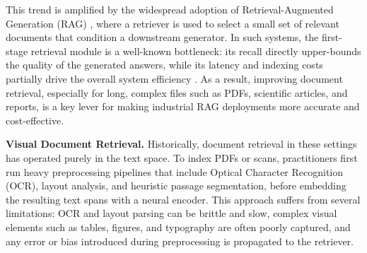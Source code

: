 This trend is amplified by the widespread adoption of Retrieval-Augmented Generation (RAG) , where a retriever is used to select a small set of relevant documents that condition a downstream generator. In such systems, the first-stage retrieval module is a well-known bottleneck: its recall directly upper-bounds the quality of the generated answers, while its latency and indexing costs partially drive the overall system efficiency . As a result, improving document retrieval, especially for long, complex files such as PDFs, scientific articles, and reports, is a key lever for making industrial RAG deployments more accurate and cost-effective.

\textbf{Visual Document Retrieval.} Historically, document retrieval in these settings has operated purely in the text space. To index PDFs or scans, practitioners first run heavy preprocessing pipelines that include Optical Character Recognition (OCR), layout analysis, and heuristic passage segmentation, before embedding the resulting text spans with a neural encoder. 
This approach suffers from several limitations: OCR and layout parsing can be brittle and slow, complex visual elements such as tables, figures, and typography are often poorly captured, and any error or bias introduced during preprocessing is propagated to the retriever. %

